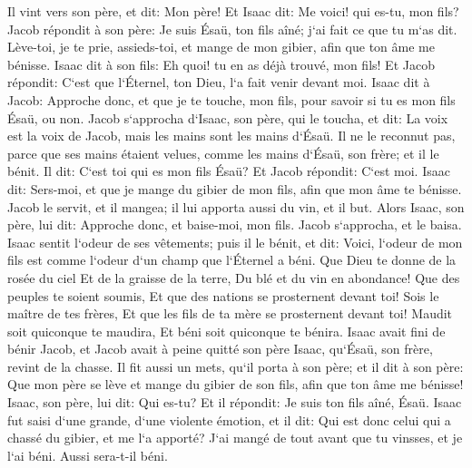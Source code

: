 \verse Il vint vers son père, et dit: Mon père! Et Isaac dit: Me voici! qui es-tu, mon fils? 
\verse Jacob répondit à son père: Je suis Ésaü, ton fils aîné; j`ai fait ce que tu m`as dit. Lève-toi, je te prie, assieds-toi, et mange de mon gibier, afin que ton âme me bénisse. 
\verse Isaac dit à son fils: Eh quoi! tu en as déjà trouvé, mon fils! Et Jacob répondit: C`est que l`Éternel, ton Dieu, l`a fait venir devant moi. 
\verse Isaac dit à Jacob: Approche donc, et que je te touche, mon fils, pour savoir si tu es mon fils Ésaü, ou non. 
\verse Jacob s`approcha d`Isaac, son père, qui le toucha, et dit: La voix est la voix de Jacob, mais les mains sont les mains d`Ésaü. 
\verse Il ne le reconnut pas, parce que ses mains étaient velues, comme les mains d`Ésaü, son frère; et il le bénit. 
\verse Il dit: C`est toi qui es mon fils Ésaü? Et Jacob répondit: C`est moi. 
\verse Isaac dit: Sers-moi, et que je mange du gibier de mon fils, afin que mon âme te bénisse. Jacob le servit, et il mangea; il lui apporta aussi du vin, et il but. 
\verse Alors Isaac, son père, lui dit: Approche donc, et baise-moi, mon fils. 
\verse Jacob s`approcha, et le baisa. Isaac sentit l`odeur de ses vêtements; puis il le bénit, et dit: Voici, l`odeur de mon fils est comme l`odeur d`un champ que l`Éternel a béni. 
\verse Que Dieu te donne de la rosée du ciel Et de la graisse de la terre, Du blé et du vin en abondance! 
\verse Que des peuples te soient soumis, Et que des nations se prosternent devant toi! Sois le maître de tes frères, Et que les fils de ta mère se prosternent devant toi! Maudit soit quiconque te maudira, Et béni soit quiconque te bénira. 
\verse Isaac avait fini de bénir Jacob, et Jacob avait à peine quitté son père Isaac, qu`Ésaü, son frère, revint de la chasse. 
\verse Il fit aussi un mets, qu`il porta à son père; et il dit à son père: Que mon père se lève et mange du gibier de son fils, afin que ton âme me bénisse! 
\verse Isaac, son père, lui dit: Qui es-tu? Et il répondit: Je suis ton fils aîné, Ésaü. 
\verse Isaac fut saisi d`une grande, d`une violente émotion, et il dit: Qui est donc celui qui a chassé du gibier, et me l`a apporté? J`ai mangé de tout avant que tu vinsses, et je l`ai béni. Aussi sera-t-il béni. 
